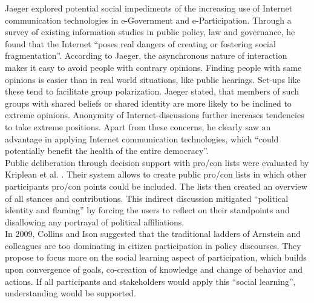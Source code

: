 Jaeger \cite{Jaeger2005_deliberate_democracy_and_egovernment} explored potential social impediments of the increasing use of Internet communication technologies in e-Government and e-Participation. Through a survey of existing information studies in public policy, law and governance, he found that the Internet ``poses real dangers of creating or fostering social fragmentation''. According to Jaeger, the asynchronous nature of interaction makes it easy to avoid people with contrary opinions. Finding people with same opinions is easier than in real world situations, like public hearings. Set-ups like these tend to facilitate group polarization. Jaeger stated, that members of such groups with shared beliefs or shared identity are more likely to be inclined to extreme opinions. Anonymity of Internet-discussions further increases tendencies to take extreme positions. Apart from these concerns, he clearly saw an advantage in applying Internet communication technologies, which ``could potentially benefit the health of the entire democracy''.\\
Public deliberation through decision support with pro/con lists were evaluated by Kriplean et al. \cite{Kriplean2012_Considerit}. Their system allows to create public pro/con lists in which other participants pro/con points could be included. The lists then created an overview of all stances and contributions. This indirect discussion mitigated ``political identity and flaming'' by forcing the users to reflect on their standpoints and disallowing any portrayal of political affiliations.\\
In 2009, Collins and Ison \cite{Collins2009_social_learning} suggested that the traditional ladders of Arnstein and colleagues are too dominating in citizen participation in policy discourses. They propose to focus more on the social learning aspect of participation, which builds upon convergence of goals, co-creation of knowledge and change of behavior and actions. If all participants and stakeholders would apply this ``social learning'', understanding would be supported.%


